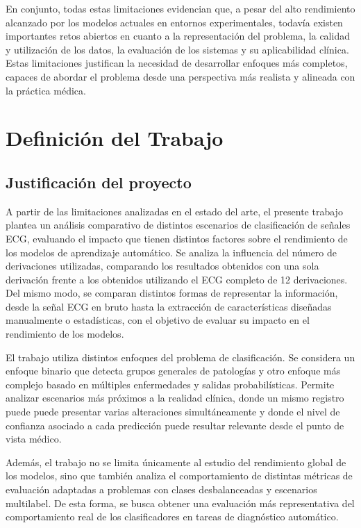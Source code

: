 \documentclass[12pt,a4paper,twoside]{book}
\begin{document}
En conjunto, todas estas limitaciones evidencian que, a pesar del alto rendimiento alcanzado por los modelos actuales en entornos experimentales, todavía existen importantes retos abiertos en cuanto a la representación del problema, la calidad y utilización de los datos, la evaluación de los sistemas y su aplicabilidad clínica. 
Estas limitaciones justifican la necesidad de desarrollar enfoques más completos, capaces de abordar el problema desde una perspectiva más realista y alineada con la práctica médica.


\chapter{Definición del Trabajo}

\section{Justificación del proyecto}

A partir de las limitaciones analizadas en el estado del arte, el presente trabajo plantea un análisis comparativo de distintos escenarios de clasificación de señales ECG, evaluando el impacto que tienen distintos factores sobre el rendimiento de los modelos de aprendizaje automático.
Se analiza la influencia del número de derivaciones utilizadas, comparando los resultados obtenidos con una sola derivación frente a los obtenidos utilizando el ECG completo de 12 derivaciones.
Del mismo modo, se comparan distintos formas de representar la información, desde la señal ECG en bruto hasta la extracción de características diseñadas manualmente o estadísticas, con el objetivo de evaluar su impacto en el rendimiento de los modelos. 

El trabajo utiliza distintos enfoques del problema de clasificación. Se considera un enfoque binario que detecta grupos generales de patologías y otro enfoque más complejo basado en múltiples enfermedades y salidas probabilísticas. 
Permite analizar escenarios más próximos a la realidad clínica, donde un mismo registro puede puede presentar varias alteraciones simultáneamente y donde el nivel de confianza asociado a cada predicción puede resultar relevante desde el punto de vista médico.

Además, el trabajo no se limita únicamente al estudio del rendimiento global de los modelos, sino que también analiza el comportamiento de distintas métricas de evaluación adaptadas a problemas con clases desbalanceadas y escenarios multilabel. 
De esta forma, se busca obtener una evaluación más representativa del comportamiento real de los clasificadores en tareas de diagnóstico automático.
\end{document}
